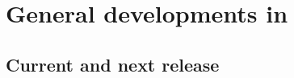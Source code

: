 

\newcommand{\AIPRELEASE}{April 15, 1999}
\newcommand{\AIPVOLUME}{Volume XIX}
\newcommand{\AIPNUMBER}{Number 1}
\newcommand{\RELEASENAME}{{\tt 15APR99}}
\newcommand{\OLDNAME}{{\tt 15OCT98}}
\newcommand{\NEXTNAME}{{\tt 15OCT99}}




\newcommand{\MYSpace}{-11pt}

\normalstyle

\section{General developments in \AIPS}

\subsection{Current and next release}

